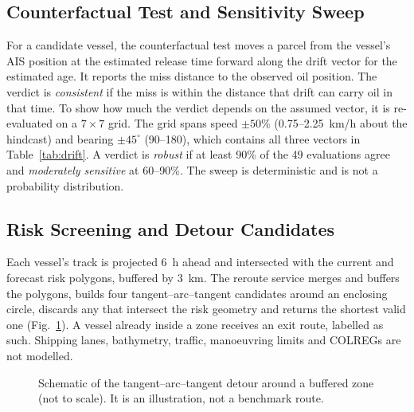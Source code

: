 \documentclass[conference]{IEEEtran}
\begin{document}
\subsection{Counterfactual Test and Sensitivity Sweep}
For a candidate vessel, the counterfactual test moves a parcel from the vessel's AIS
position at the estimated release time forward along the drift vector for the
estimated age. It reports the miss distance to the observed oil position. The verdict
is \emph{consistent} if the miss is within the distance that drift can carry oil in that
time. To show how much the verdict depends on the assumed vector, it is re-evaluated on
a $7\times7$ grid. The grid spans speed $\pm50\%$ (0.75--2.25~km/h about the hindcast)
and bearing $\pm45^\circ$ (90--180\textdegree), which contains all three vectors in
Table~\ref{tab:drift}. A verdict is \emph{robust} if at least 90\% of the 49 evaluations
agree and \emph{moderately sensitive} at 60--90\%. The sweep is deterministic and is not a
probability distribution.

\subsection{Risk Screening and Detour Candidates}
Each vessel's track is projected 6~h ahead and intersected with the current and forecast
risk polygons, buffered by 3~km. The reroute service merges and buffers the polygons,
builds four tangent--arc--tangent candidates around an enclosing circle, discards any that
intersect the risk geometry and returns the shortest valid one (Fig.~\ref{fig:detour}).
A vessel already inside a zone receives an exit route, labelled as such. Shipping lanes,
bathymetry, traffic, manoeuvring limits and COLREGs are not modelled.

\begin{figure}[t]
\centering
{}
\caption{Schematic of the tangent--arc--tangent detour around a buffered zone (not to
scale). It is an illustration, not a benchmark route.}
\label{fig:detour}
\end{figure}
\end{document}
